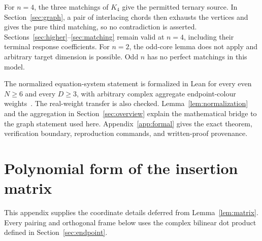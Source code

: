 \documentclass[11pt]{article}
\theoremstyle{definition}
\theoremstyle{plain}
\numberwithin{equation}{section}
\begin{document}
For \(n=4\), the three matchings of \(K_4\) give the permitted ternary
source. In Section~\ref{sec:graph}, a pair of interlacing chords then exhausts
the vertices and gives the pure third matching, so no contradiction is asserted.
Sections~\ref{sec:higher}--\ref{sec:matching} remain valid at \(n=4\), including
their terminal response coefficients. For \(n=2\), the odd-core lemma does not
apply and arbitrary target dimension is possible. Odd \(n\) has no perfect
matchings in this model.

The normalized equation-system statement is formalized in Lean for every
even \(N\ge6\) and every \(D\ge3\), with arbitrary complex aggregate
endpoint-colour weights~\cite{lean}. The real-weight transfer is also checked.
Lemma~\ref{lem:normalization} and the aggregation in
Section~\ref{sec:overview} explain the mathematical bridge to the graph
statement used here. Appendix~\ref{app:formal} gives the exact theorem,
verification boundary, reproduction commands, and written-proof provenance.

\appendix
\section{Polynomial form of the insertion matrix}\label{app:normalform}

This appendix supplies the coordinate details deferred from
Lemma~\ref{lem:matrix}. Every pairing and orthogonal frame below uses the
complex bilinear dot product defined in Section~\ref{sec:endpoint}.
\end{document}
